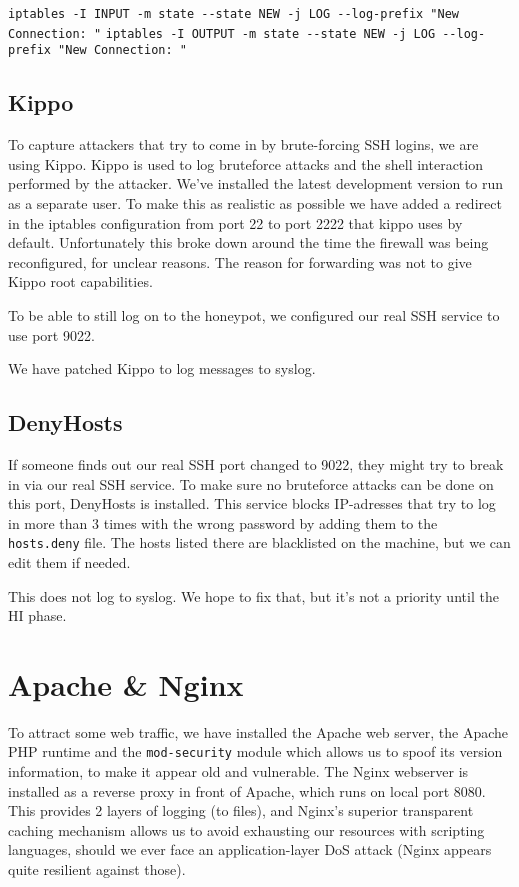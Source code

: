\documentclass[11pt]{article} %
\begin{document}
\verb|iptables -I INPUT -m state --state NEW -j LOG --log-prefix "New Connection: "|
\verb|iptables -I OUTPUT -m state --state NEW -j LOG --log-prefix "New Connection: "|

\subsection{Kippo}
To capture attackers that try to come in by brute-forcing SSH logins, we are using Kippo. 
Kippo is used to log bruteforce attacks and the shell interaction performed by the attacker. 
We've installed the latest development version to run as a separate user.
To make this as realistic as possible we have added a redirect in the iptables configuration from port 22 to port 2222 that kippo uses by default.
Unfortunately this broke down around the time the firewall was being reconfigured, for unclear reasons. 
The reason for forwarding was not to give Kippo root capabilities.

To be able to still log on to the honeypot, we configured our real SSH service to use port 9022.

We have patched Kippo to log messages to syslog.

\subsection{DenyHosts}
If someone finds out our real SSH port changed to 9022, they might try to break in via our real SSH service.
To make sure no bruteforce attacks can be done on this port, DenyHosts is installed.
This service blocks IP-adresses that try to log in more than 3 times with the wrong password by adding them to the \verb|hosts.deny| file.
The hosts listed there are blacklisted on the machine, but we can edit them if needed.

This does not log to syslog. We hope to fix that, but it's not a priority until the HI phase.

\section{Apache \& Nginx}
To attract some web traffic, we have installed the Apache web server, the Apache PHP runtime and the \verb|mod-security| module which allows us to spoof its version information, to make it appear old and vulnerable.
The Nginx webserver is installed as a reverse proxy in front of Apache, which runs on local port 8080.
This provides 2 layers of logging (to files), and Nginx's superior transparent caching mechanism allows us to avoid exhausting our resources with scripting languages, should we ever face an application-layer DoS attack (Nginx appears quite resilient against those).
\end{document}
